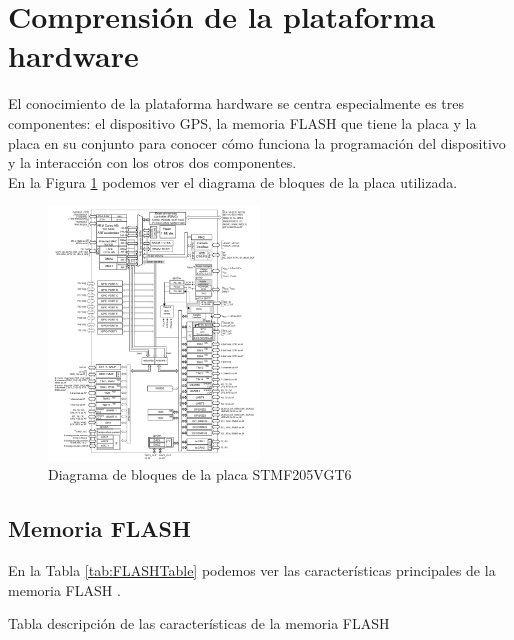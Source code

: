 \section{Comprensión de la plataforma hardware}
\label{obj1}
El conocimiento de la plataforma hardware se centra especialmente es tres componentes: el dispositivo GPS, la memoria FLASH que tiene la placa y la placa en su conjunto para conocer cómo funciona la programación del dispositivo y la interacción con los otros dos componentes.\\

En la Figura \ref{fig:BlocksSTM32} podemos ver el diagrama de bloques de la placa utilizada.\\

\begin{figure}[!h]
\begin{center}
\includegraphics[width=0.5\textwidth]{figs/BlocksSTM32.png}
\caption{Diagrama de bloques de la placa STMF205VGT6}
\label{fig:BlocksSTM32}
\end{center}
\end{figure}

\subsection{Memoria FLASH}

En la Tabla \ref{tab:FLASHTable} podemos ver las características principales de la memoria FLASH \cite{bib:flash}.\\

\begin{table}[h!]
\centering

\caption {Tabla descripción de las características de la memoria FLASH}
\label{tab:FLASHTable}
\end{table}



